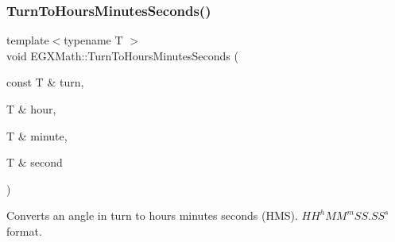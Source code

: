 \subsubsection{\texorpdfstring{Turn\+To\+Hours\+Minutes\+Seconds()}{TurnToHoursMinutesSeconds()}}
{\footnotesize\ttfamily template$<$typename T $>$ \\
void E\+G\+X\+Math\+::\+Turn\+To\+Hours\+Minutes\+Seconds (\begin{DoxyParamCaption}\item[{const T \&}]{turn,  }\item[{T \&}]{hour,  }\item[{T \&}]{minute,  }\item[{T \&}]{second }\end{DoxyParamCaption})}



Converts an angle in turn to hours minutes seconds (H\+MS). ${HH}^h{MM}^m{SS.SS}^s$ format. 


